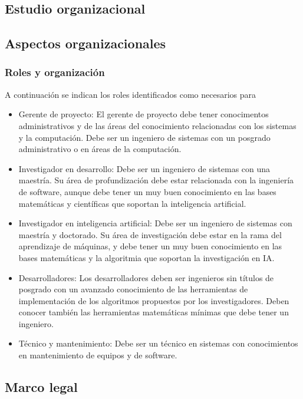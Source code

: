 \documentclass[a4paper, 12pt, oneside]{article}
\begin{document}
	\begin{center}
	\section{Estudio organizacional}
	\end{center}
	
	\subsection{Aspectos organizacionales}
	
	\subsubsection{Roles y organización}
	A continuación se indican los roles identificados como necesarios para
	\begin{itemize}
		\item {\bd Gerente de proyecto:} El gerente de proyecto debe tener conocimentos administrativos y de las áreas del conocimiento relacionadas con los sistemas y la computación. Debe ser un ingeniero de sistemas con un posgrado administrativo o en áreas de la computación.
		\item {\bd Investigador en desarrollo:} Debe ser un ingeniero de sistemas con una maestría. Su área de profundización debe estar relacionada con la ingeniería de software, aunque debe tener un muy buen conocimiento en las bases matemáticas y científicas que soportan la inteligencia artificial.
		\item {\bd Investigador en inteligencia artificial:} Debe ser un ingeniero de sistemas con maestría y doctorado. Su área de investigación debe estar en la rama del aprendizaje de máquinas, y debe tener un muy buen conocimiento en las bases matemáticas y la algoritmia que soportan la investigación en IA.
		\item {\bd Desarrolladores:} Los desarrolladores deben ser ingenieros sin títulos de posgrado con un avanzado conocimiento de las herramientas de implementación de los algoritmos propuestos por los investigadores. Deben conocer también las herramientas matemáticas mínimas que debe tener un ingeniero.
		\item {\bd Técnico y mantenimiento:} Debe ser un técnico en sistemas con conocimientos en mantenimiento de equipos y de software.
	\end{itemize}	
		
	\subsection{Marco legal}
	
\end{document}
